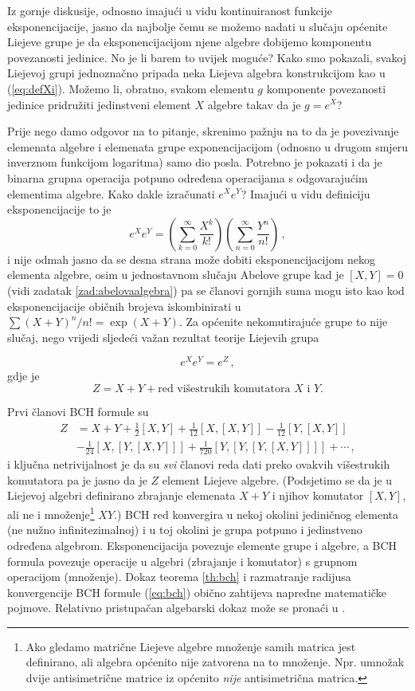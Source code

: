 Iz gornje diskusije, odnosno imajući u vidu kontinuiranost funkcije
eksponencijacije, jasno da najbolje čemu se možemo nadati u
slučaju općenite Liejeve grupe je da
eksponencijacijom njene algebre dobijemo komponentu povezanosti
jedinice. No je li barem to uvijek moguće?
Kako smo pokazali, svakoj Liejevoj grupi jednoznačno pripada neka Liejeva algebra
konstrukcijom kao u (\ref{eq:defXi}). Možemo li, obratno, svakom
elementu $g$  komponente povezanosti jedinice pridružiti jedinstveni
element $X$ algebre takav da je $g = e^{X}$?

Prije nego damo odgovor na to pitanje, skrenimo pažnju na to da je
povezivanje elemenata algebre i elemenata grupe exponencijacijom
(odnosno u drugom smjeru inverznom funkcijom logaritma) samo dio
posla. Potrebno je pokazati i da je binarna grupna operacija potpuno
određena operacijama s odgovarajućim elementima algebre. Kako
dakle izračunati $e^X e^Y$? Imajući u vidu definiciju eksponencijacije
to je
\begin{equation}
   e^X e^Y = \left(\sum_{k=0}^{\infty} \frac{X^k}{k!}\right)
             \left(\sum_{n=0}^{\infty} \frac{Y^n}{n!}\right)
    \,,
\end{equation}
i nije odmah jasno da se desna strana može dobiti eksponencijacijom nekog
elementa algebre, osim u jednostavnom slučaju Abelove grupe kad je 
$[X, Y]=0$ (vidi zadatak \ref{zad:abelovaalgebra}) pa se članovi
gornjih suma mogu isto kao kod eksponencijacije običnih brojeva
iskombinirati u $\sum (X+Y)^{n}/n! = \exp(X+Y)$. Za općenite
nekomutirajuće grupe to nije slučaj, nego vrijedi sljedeći važan
rezultat teorije Liejevih grupa
\begin{teorem} \label{th:bch}
    \[ e^X e^Y = e^Z \,, \]
  gdje je 
  \[ Z = X + Y + \text{red višestrukih komutatora $X$ i $Y$.} \]
\end{teorem}
Prvi članovi BCH formule su
\begin{align}
    Z& = X + Y + \frac{1}{2}[X, Y] + \frac{1}{12}[X, [X, Y]] 
       - \frac{1}{12}[Y, [X, Y]] \nonumber \\
     &   - \frac{1}{24}[X, [Y, [X, Y]]] + \frac{1}{720}[Y, [Y, [Y, [X, Y]]]] 
         + \cdots \,,
   \label{eq:bch}
\end{align}
i ključna netrivijalnost je da su \emph{svi} članovi reda dati preko
ovakvih višestrukih komutatora pa je jasno da je $Z$ element Liejeve algebre.
(Podsjetimo se da je u Liejevoj algebri definirano zbrajanje elemenata $X+Y$ i njihov
 komutator $[X, Y]$, ali ne i množenje\footnote{Ako gledamo matrične
    Liejeve algebre množenje samih matrica jest definirano, ali algebra općenito nije zatvorena
    na to množenje. Npr. umnožak dvije antisimetrične matrice iz  
    općenito \emph{nije} antisimetrična matrica.} $X Y$.)
BCH red konvergira u nekoj okolini jediničnog elementa (ne nužno infinitezimalnoj)
i u toj okolini je grupa potpuno i jedinstveno određena algebrom.
Eksponencijacija povezuje elemente grupe i algebre, a BCH formula povezuje
operacije u algebri (zbrajanje i komutator) s grupnom operacijom (množenje).
Dokaz teorema \ref{th:bch}  i razmatranje radijusa konvergencije BCH formule (\ref{eq:bch}) 
obično zahtijeva napredne matematičke
pojmove. Relativno pristupačan algebarski dokaz može se pronaći
u \cite{Stilwell:2008}.

